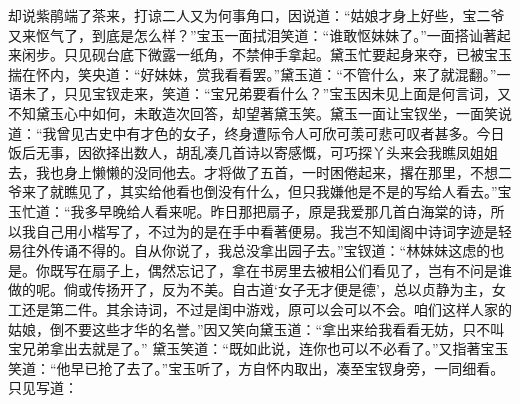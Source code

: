 \begin{parag}
    却说紫鹃端了茶来，打谅二人又为何事角口，因说道：“姑娘才身上好些，宝二爷又来怄气了，到底是怎么样？”宝玉一面拭泪笑道：“谁敢怄妹妹了。”一面搭讪著起来闲步。只见砚台底下微露一纸角，不禁伸手拿起。黛玉忙要起身来夺，已被宝玉揣在怀内，笑央道：“好妹妹，赏我看看罢。”黛玉道：“不管什么，来了就混翻。”一语未了，只见宝钗走来，笑道：“宝兄弟要看什么？”宝玉因未见上面是何言词，又不知黛玉心中如何，未敢造次回答，却望著黛玉笑。黛玉一面让宝钗坐，一面笑说道：“我曾见古史中有才色的女子，终身遭际令人可欣可羡可悲可叹者甚多。今日饭后无事，因欲择出数人，胡乱凑几首诗以寄感慨，可巧探丫头来会我瞧凤姐姐去，我也身上懒懒的没同他去。才将做了五首，一时困倦起来，撂在那里，不想二爷来了就瞧见了，其实给他看也倒没有什么，但只我嫌他是不是的写给人看去。”宝玉忙道：“我多早晚给人看来呢。昨日那把扇子，原是我爱那几首白海棠的诗，所以我自己用小楷写了，不过为的是在手中看著便易。我岂不知闺阁中诗词字迹是轻易往外传诵不得的。自从你说了，我总没拿出园子去。”宝钗道：“林妹妹这虑的也是。你既写在扇子上，偶然忘记了，拿在书房里去被相公们看见了，岂有不问是谁做的呢。倘或传扬开了，反为不美。自古道‘女子无才便是德’，总以贞静为主，女工还是第二件。其余诗词，不过是闺中游戏，原可以会可以不会。咱们这样人家的姑娘，倒不要这些才华的名誉。”因又笑向黛玉道：“拿出来给我看看无妨，只不叫宝兄弟拿出去就是了。” 黛玉笑道：“既如此说，连你也可以不必看了。”又指著宝玉笑道：“他早已抢了去了。”宝玉听了，方自怀内取出，凑至宝钗身旁，一同细看。只见写道：
\end{parag}


